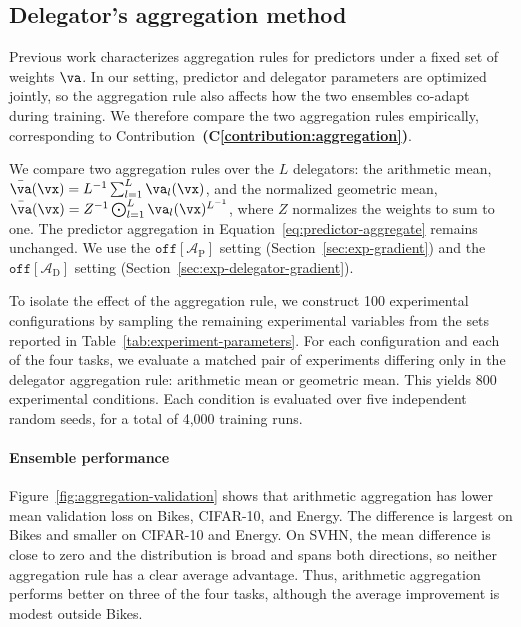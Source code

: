 \documentclass[10pt]{article} %
\newcommand{\dambiguity}{\mathcal{A}_{\mathrm{D}}}
\newcommand{\pambiguity}{\mathcal{A}_{\mathrm{P}}}
\newcommand{\ambiguityoff}[1]{\ensuremath{\mathtt{off}[#1]}}
\newcounter{contribution}
\newcommand{\contributionref}[1]{\textbf{(C\ref{contribution:#1})}}
\begin{document}
\subsection{Delegator's aggregation method} \label{sec:exp-agg}

Previous work \citep{pmlr-v151-ortega22a, wood2023unified} characterizes aggregation rules for predictors under a fixed set of weights $\va$. In our setting, predictor and delegator parameters are optimized jointly, so the aggregation rule also affects how the two ensembles co-adapt during training. We therefore compare the two aggregation rules empirically, corresponding to Contribution~\contributionref{aggregation}.

We compare two aggregation rules over the $L$ delegators: the arithmetic mean, $\bar{\va}(\vx) = L^{-1}\sum_{l=1}^{L}\va_l(\vx)$, and the normalized geometric mean, $\bar{\va}(\vx) = Z^{-1}\bigodot_{l=1}^{L}\va_l(\vx)^{L^{-1}}$, where $Z$ normalizes the weights to sum to one. The predictor aggregation in Equation~\ref{eq:predictor-aggregate} remains unchanged. We use the \ambiguityoff{\pambiguity} setting (Section~\ref{sec:exp-gradient}) and the \ambiguityoff{\dambiguity} setting (Section~\ref{sec:exp-delegator-gradient}).

To isolate the effect of the aggregation rule, we construct 100 experimental configurations by sampling the remaining experimental variables from the sets reported in Table~\ref{tab:experiment-parameters}. For each configuration and each of the four tasks, we evaluate a matched pair of experiments differing only in the delegator aggregation rule: arithmetic mean or geometric mean. This yields 800 experimental conditions. Each condition is evaluated over five independent random seeds, for a total of 4,000 training runs.
 
\paragraph{Ensemble performance}

Figure~\ref{fig:aggregation-validation} shows that arithmetic aggregation has lower mean validation loss on Bikes, CIFAR-10, and Energy. The difference is largest on Bikes and smaller on CIFAR-10 and Energy. On SVHN, the mean difference is close to zero and the distribution is broad and spans both directions, so neither aggregation rule has a clear average advantage. Thus, arithmetic aggregation performs better on three of the four tasks, although the average improvement is modest outside Bikes.
\end{document}
